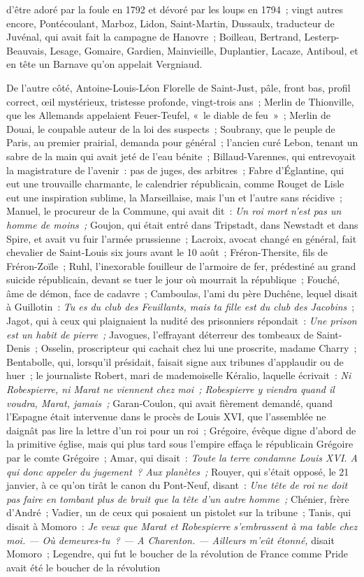 \documentclass[french,twoside]{book} %
\begin{document}
d’être adoré par la foule en 1792 et dévoré par les loups en 1794 ; vingt autres encore, Pontécoulant, Marboz, Lidon, Saint-Martin, Dussaulx, traducteur de Juvénal, qui avait fait la campagne de Hanovre ; Boilleau, Bertrand, Lesterp-Beauvais, Lesage, Gomaire, Gardien, Mainvieille, Duplantier, Lacaze, Antiboul, et en tête un Barnave qu’on appelait Vergniaud.\par
De l’autre côté, Antoine-Louis-Léon Florelle de Saint-Just, pâle, front bas, profil correct, œil mystérieux, tristesse profonde, vingt-trois ans ; Merlin de Thionville, que les Allemands appelaient Feuer-Teufel, « le diable de feu » ; Merlin de Douai, le coupable auteur de la loi des suspects ; Soubrany, que le peuple de Paris, au premier prairial, demanda pour général ; l’ancien curé Lebon, tenant un sabre de la main qui  avait jeté de l’eau bénite ; Billaud-Varennes, qui entrevoyait la magistrature de l’avenir : pas de juges, des arbitres ; Fabre d’Églantine, qui eut une trouvaille charmante, le calendrier républicain, comme Rouget de Lisle eut une inspiration sublime, la Marseillaise, mais l’un et l’autre sans récidive ; Manuel, le procureur de la Commune, qui avait dit : \emph{Un roi mort n’est pas un homme de moins ;} Goujon, qui était entré dans Tripstadt, dans Newstadt et dans Spire, et avait vu fuir l’armée prussienne ; Lacroix, avocat changé en général, fait chevalier de Saint-Louis six jours avant le 10 août ; Fréron-Thersite, fils de Fréron-Zoïle ; Ruhl, l’inexorable fouilleur de l’armoire de fer, prédestiné au grand suicide républicain, devant se tuer le jour où mourrait la république ; Fouché, âme de démon, face de cadavre ; Camboulas, l’ami du père Duchêne, lequel disait à Guillotin : \emph{Tu es du club des Feuillants, mais ta fille est du club des Jacobins} ; Jagot, qui à ceux qui plaignaient la nudité des prisonniers répondait : \emph{Une prison est un habit de pierre ;} Javogues, l’effrayant déterreur des tombeaux de Saint-Denis ; Osselin, proscripteur qui cachait chez lui une proscrite, madame Charry ; Bentabolle, qui, lorsqu’il présidait, faisait signe aux tribunes d’applaudir ou de huer ; le journaliste Robert, mari de mademoiselle Kéralio, laquelle écrivait : \emph{Ni Robespierre, ni Marat ne viennent chez moi ; Robespierre y viendra quand il voudra, Marat, jamais ;} Garan-Coulon, qui avait fièrement demandé, quand l’Espagne était intervenue dans le procès de Louis XVI, que l’assemblée ne daignât pas lire la  lettre d’un roi pour un roi ; Grégoire, évêque digne d’abord de la primitive église, mais qui plus tard sous l’empire effaça le républicain Grégoire par le comte Grégoire ; Amar, qui disait : \emph{Toute la terre condamne Louis XVI. A qui donc appeler du jugement ? Aux planètes ;} Rouyer, qui s’était opposé, le 21 janvier, à ce qu’on tirât le canon du Pont-Neuf, disant : \emph{Une tête de roi ne doit pas faire en tombant plus de bruit que la tête d’un autre homme ;} Chénier, frère d’André ; Vadier, un de ceux qui posaient un pistolet sur la tribune ; Tanis, qui disait à Momoro : \emph{Je veux que Marat et Robespierre s’embrassent à ma table chez moi. — Où demeures-tu ? — A Charenton. — Ailleurs m’eût étonné,} disait Momoro ; Legendre, qui fut le boucher de la révolution de France comme Pride avait été le boucher de la révolution 
\end{document}
